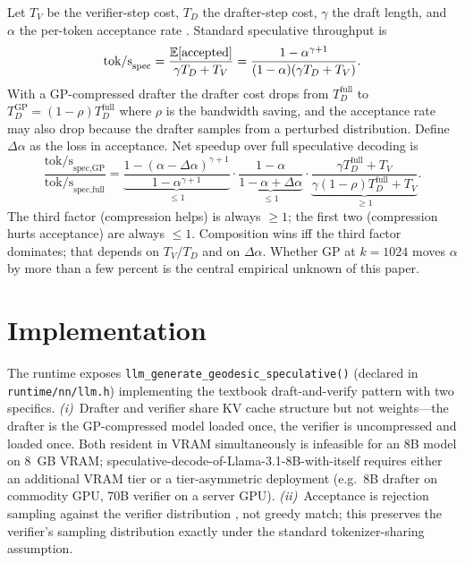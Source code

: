 \documentclass[11pt]{article}
\begin{document}
Let $T_V$ be the verifier-step cost, $T_D$ the drafter-step cost, $\gamma$
the draft length, and $\alpha$ the per-token acceptance rate
\cite{leviathan2023speculative}.  Standard speculative throughput is
\begin{equation}
\label{eq:spec}
\text{tok/s}_\text{spec}
= \frac{\mathbb{E}[\text{accepted}]}{\gamma T_D + T_V}
= \frac{1-\alpha^{\gamma+1}}{(1-\alpha)(\gamma T_D+T_V)}.
\end{equation}
With a GP-compressed drafter the drafter cost drops from
$T_D^\text{full}$ to $T_D^\text{GP}=(1-\rho)T_D^\text{full}$ where
$\rho$ is the bandwidth saving, and the acceptance rate may also drop
because the drafter samples from a perturbed distribution.  Define
$\Delta\alpha$ as the loss in acceptance.  Net speedup over full
speculative decoding is
\begin{equation}
\label{eq:netspeedup}
\frac{\text{tok/s}_\text{spec,GP}}{\text{tok/s}_\text{spec,full}}
=
\underbrace{\frac{1-(\alpha-\Delta\alpha)^{\gamma+1}}{1-\alpha^{\gamma+1}}}_{\leq 1}
\cdot
\underbrace{\frac{1-\alpha}{1-\alpha+\Delta\alpha}}_{\leq 1}
\cdot
\underbrace{\frac{\gamma T_D^\text{full}+T_V}{\gamma(1-\rho)T_D^\text{full}+T_V}}_{\geq 1}.
\end{equation}
The third factor (compression helps) is always $\geq 1$; the first two
(compression hurts acceptance) are always $\leq 1$.  Composition wins iff
the third factor dominates; that depends on $T_V/T_D$ and on $\Delta\alpha$.
Whether GP at $k{=}1024$ moves $\alpha$ by more than a few percent is the
central empirical unknown of this paper.

\section{Implementation}
The runtime exposes
\texttt{llm\_generate\_geodesic\_speculative()} (declared in
\texttt{runtime/nn/llm.h}) implementing the textbook draft-and-verify
pattern with two specifics.  \emph{(i)}~Drafter and verifier share KV
cache structure but not weights---the drafter is the GP-compressed
model loaded once, the verifier is uncompressed and loaded once.  Both
resident in VRAM simultaneously is infeasible for an 8B model on 8~GB
VRAM; speculative-decode-of-Llama-3.1-8B-with-itself requires either an
additional VRAM tier or a tier-asymmetric deployment (e.g.\ 8B drafter
on commodity GPU, 70B verifier on a server GPU).  \emph{(ii)}~Acceptance
is rejection sampling against the verifier distribution
\cite{leviathan2023speculative,chen2023speculative}, not greedy match;
this preserves the verifier's sampling distribution exactly under the
standard tokenizer-sharing assumption.
\end{document}
